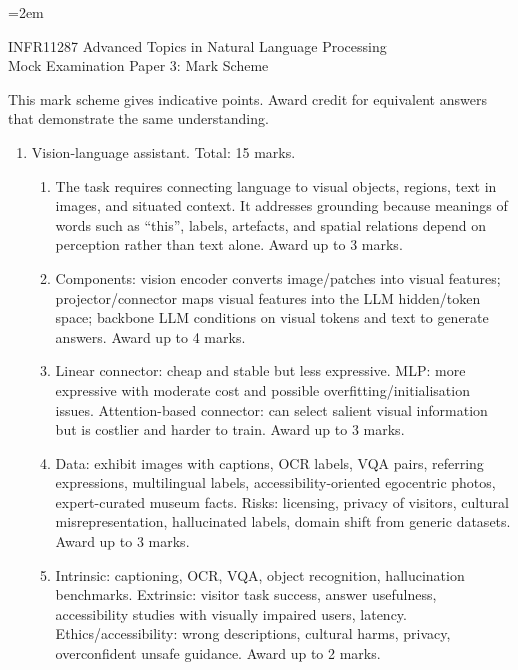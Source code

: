 \documentclass[11pt,a4paper]{article}
\begin{document}
\emergencystretch=2em

\begin{center}
{\Large INFR11287 Advanced Topics in Natural Language Processing}\\[0.5em]
{\Large Mock Examination Paper 3: Mark Scheme}\\[1em]
\end{center}

\noindent This mark scheme gives indicative points. Award credit for equivalent answers that demonstrate the same understanding.

\begin{enumerate}[leftmargin=*]
\item Vision-language assistant. Total: 15 marks.
\begin{enumerate}
\item The task requires connecting language to visual objects, regions, text in images, and situated context. It addresses grounding because meanings of words such as ``this'', labels, artefacts, and spatial relations depend on perception rather than text alone. Award up to 3 marks.
\item Components: vision encoder converts image/patches into visual features; projector/connector maps visual features into the LLM hidden/token space; backbone LLM conditions on visual tokens and text to generate answers. Award up to 4 marks.
\item Linear connector: cheap and stable but less expressive. MLP: more expressive with moderate cost and possible overfitting/initialisation issues. Attention-based connector: can select salient visual information but is costlier and harder to train. Award up to 3 marks.
\item Data: exhibit images with captions, OCR labels, VQA pairs, referring expressions, multilingual labels, accessibility-oriented egocentric photos, expert-curated museum facts. Risks: licensing, privacy of visitors, cultural misrepresentation, hallucinated labels, domain shift from generic datasets. Award up to 3 marks.
\item Intrinsic: captioning, OCR, VQA, object recognition, hallucination benchmarks. Extrinsic: visitor task success, answer usefulness, accessibility studies with visually impaired users, latency. Ethics/accessibility: wrong descriptions, cultural harms, privacy, overconfident unsafe guidance. Award up to 2 marks.
\end{enumerate}


\end{enumerate}
\end{document}
